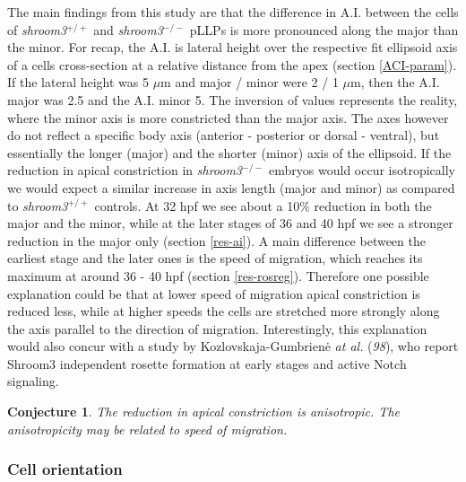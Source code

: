 \documentclass[11pt,singlespacinge,twoside]{reedthesis} %
\newtheorem{conjecture}{Conjecture}[chapter]
\theoremstyle{definition}
\theoremstyle{definition}
\theoremstyle{definition}
\theoremstyle{remark}
\begin{document}
The main findings from this study are that the difference in A.I. between the cells of \emph{shroom3}\(^{+/+}\) and \emph{shroom3}\(^{-/-}\) pLLPs is more pronounced along the major than the minor. For recap, the A.I. is lateral height over the respective fit ellipsoid axis of a cells cross-section at a relative distance from the apex (section \ref{ACI-param}). If the lateral height was 5 \(\mu\)m and major / minor were 2 / 1 \(\mu\)m, then the A.I. major was 2.5 and the A.I. minor 5. The inversion of values represents the reality, where the minor axis is more constricted than the major axis. The axes however do not reflect a specific body axis (anterior - posterior or dorsal - ventral), but essentially the longer (major) and the shorter (minor) axis of the ellipsoid. If the reduction in apical constriction in \emph{shroom3}\(^{-/-}\) embryos would occur isotropically we would expect a similar increase in axis length (major and minor) as compared to \emph{shroom3}\(^{+/+}\) controls. At 32 hpf we see about a 10\(\%\) reduction in both the major and the minor, while at the later stages of 36 and 40 hpf we see a stronger reduction in the major only (section \ref{res-ai}). A main difference between the earliest stage and the later ones is the speed of migration, which reaches its maximum at around 36 - 40 hpf (section \ref{res-rosreg}). Therefore one possible explanation could be that at lower speed of migration apical constriction is reduced less, while at higher speeds the cells are stretched more strongly along the axis parallel to the direction of migration. Interestingly, this explanation would also concur with a study by Kozlovskaja-Gumbrienė \emph{at al.} (\emph{98}), who report Shroom3 independent rosette formation at early stages and active Notch signaling.
\begin{conjecture}
\protect\hypertarget{cnj:unnamed-chunk-15}{}{\label{cnj:unnamed-chunk-15} }The reduction in apical constriction is anisotropic. The anisotropicity may be related to speed of migration.
\end{conjecture}
\hypertarget{cell-orientation}{%
\subsubsection{Cell orientation}\label{cell-orientation}}
\end{document}

